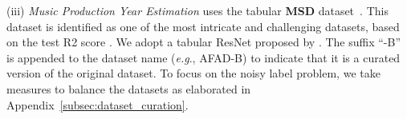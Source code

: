\documentclass{article}
\def\eg{\textit{e.g}., } \def\Eg{\textit{E.g}., }
\theoremstyle{plain}
\theoremstyle{definition}
\theoremstyle{remark}
\begin{document}
(iii) \textit{Music Production Year Estimation} uses the tabular \textbf{MSD} dataset~\citep{bertin11msd}. 
This dataset is identified as one of the most intricate and challenging datasets, based on the test R2 score \citep{grinsztajn22nips}.
We adopt a tabular ResNet proposed by \citet{gorishniy21nips}.
The suffix ``-B'' is appended to the dataset name (\eg AFAD-B) to indicate that it is a curated version of the original dataset.
To focus on the noisy label problem, we take measures to balance the datasets as elaborated in Appendix~\ref{subsec:dataset_curation}.

\end{document}
